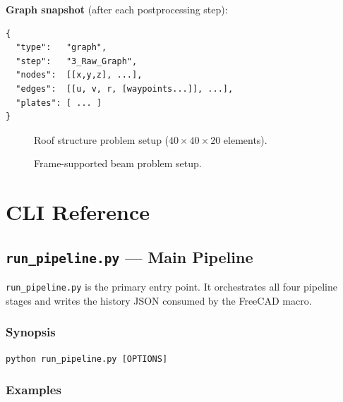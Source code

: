\documentclass[a4paper, 11pt, openany]{report}
\begin{document}
\textbf{Graph snapshot} (after each postprocessing step):
\begin{lstlisting}[style=textstyle]
{
  "type":   "graph",
  "step":   "3_Raw_Graph",
  "nodes":  [[x,y,z], ...],
  "edges":  [[u, v, r, [waypoints...]], ...],
  "plates": [ ... ]
}
\end{lstlisting}



\begin{figure}[htbp]
\centering

\caption{Roof structure problem setup ($40 \times 40 \times 20$ elements).}
\label{fig:roof-problem-setup}
\end{figure}

\begin{figure}[htbp]
\centering

\caption{Frame-supported beam problem setup.}
\label{fig:frame-supported-beam}
\end{figure}


\chapter{CLI Reference}
\label{ch:cli}

\section{\texttt{run\_pipeline.py} --- Main Pipeline}
\label{sec:cli-pipeline}

\texttt{run\_pipeline.py} is the primary entry point.  It orchestrates all four
pipeline stages and writes the history JSON consumed by the FreeCAD macro.

\subsection{Synopsis}

\begin{lstlisting}[style=bashstyle]
python run_pipeline.py [OPTIONS]
\end{lstlisting}

\subsection{Examples}
\end{document}
